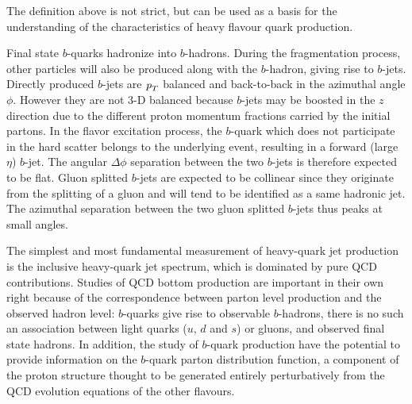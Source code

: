 The definition above is not strict, but can be used as a basis for the understanding of the characteristics of heavy flavour quark production.

Final state $b$-quarks hadronize into $b$-hadrons. During the fragmentation process, other particles will also be produced along with the $b$-hadron, giving rise to $b$-jets. Directly produced $b$-jets are ${\emph{p}_{T}}$ balanced and back-to-back in the azimuthal angle $\phi$. However they are not 3-D balanced because $b$-jets may be boosted in the $z$ direction due to the different proton momentum fractions carried by the initial partons.  In the flavor excitation process, the $b$-quark which does not participate in the hard scatter belongs to the underlying event, resulting in a forward (large $\eta$) $b$-jet.  The angular $\Delta \phi$ separation between the two $b$-jets is therefore expected to be flat.  Gluon splitted $b$-jets are expected to be collinear since they originate from the splitting of a gluon and will tend to be identified as a same hadronic jet. The azimuthal separation between the two gluon splitted $b$-jets thus peaks at small angles.




The simplest and most fundamental measurement of heavy-quark jet production is
the inclusive heavy-quark jet spectrum, which is dominated by pure QCD contributions. 
Studies of QCD bottom production are important in their own right because of the correspondence between parton level production and the observed hadron level: $b$-quarks give rise to observable $b$-hadrons, there is no such an association between light quarks ($u$, $d$ and $s$) or gluons, and observed final state hadrons. In addition, the study of $b$-quark production have the potential to provide information on the $b$-quark parton distribution function, a component of the proton structure thought to be generated entirely perturbatively from the QCD evolution equations of the other flavours. 

